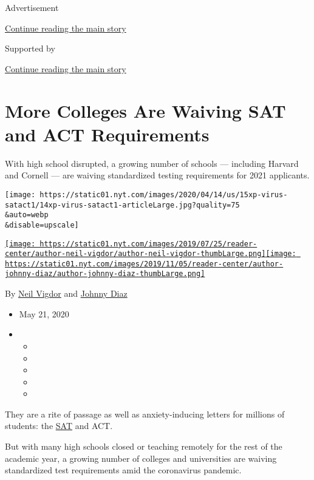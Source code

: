 Advertisement

\protect\hyperlink{after-top}{Continue reading the main story}

Supported by

\protect\hyperlink{after-sponsor}{Continue reading the main story}

\hypertarget{more-colleges-are-waiving-sat-and-act-requirements}{%
\section{More Colleges Are Waiving SAT and ACT
Requirements}\label{more-colleges-are-waiving-sat-and-act-requirements}}

With high school disrupted, a growing number of schools --- including
Harvard and Cornell --- are waiving standardized testing requirements
for 2021 applicants.

\texttt{[image: https://static01.nyt.com/images/2020/04/14/us/15xp-virus-satact1/14xp-virus-satact1-articleLarge.jpg?quality=75\\\&auto=webp\\\&disable=upscale]}

\href{https://www.nytimes.com/by/neil-vigdor}{\texttt{[image: https://static01.nyt.com/images/2019/07/25/reader-center/author-neil-vigdor/author-neil-vigdor-thumbLarge.png]}}\href{https://www.nytimes.com/by/johnny-diaz}{\texttt{[image: https://static01.nyt.com/images/2019/11/05/reader-center/author-johnny-diaz/author-johnny-diaz-thumbLarge.png]}}

By \href{https://www.nytimes.com/by/neil-vigdor}{Neil Vigdor} and
\href{https://www.nytimes.com/by/johnny-diaz}{Johnny Diaz}

\begin{itemize}
\item
  May 21, 2020
\item
  \begin{itemize}
  \item
  \item
  \item
  \item
  \item
  \end{itemize}
\end{itemize}

They are a rite of passage as well as anxiety-inducing letters for
millions of students: the
\href{https://www.nytimes.com/2020/06/02/us/at-home-sat-coronavirus.html}{SAT}
and ACT.

But with many high schools closed or teaching remotely for the rest of
the academic year, a growing number of colleges and universities are
waiving standardized test requirements amid the coronavirus pandemic.

